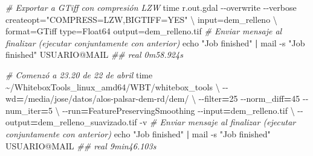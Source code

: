 \documentclass[spanish]{article}
\newenvironment{Shaded}{\begin{snugshade}}{\end{snugshade}}
\newcommand{\AttributeTok}[1]{\textcolor[rgb]{0.77,0.63,0.00}{#1}}
\newcommand{\BuiltInTok}[1]{#1}
\newcommand{\CommentTok}[1]{\textcolor[rgb]{0.56,0.35,0.01}{\textit{#1}}}
\newcommand{\DataTypeTok}[1]{\textcolor[rgb]{0.13,0.29,0.53}{#1}}
\newcommand{\ExtensionTok}[1]{#1}
\newcommand{\KeywordTok}[1]{\textcolor[rgb]{0.13,0.29,0.53}{\textbf{#1}}}
\newcommand{\NormalTok}[1]{#1}
\newcommand{\OperatorTok}[1]{\textcolor[rgb]{0.81,0.36,0.00}{\textbf{#1}}}
\newcommand{\StringTok}[1]{\textcolor[rgb]{0.31,0.60,0.02}{#1}}
\begin{document}
\begin{Shaded}
\begin{Highlighting}[]
\CommentTok{\# Exportar a GTiff con compresión LZW}
\BuiltInTok{time}\NormalTok{ r.out.gdal }\AttributeTok{{-}{-}overwrite} \AttributeTok{{-}{-}verbose}\NormalTok{ createopt=}\StringTok{"COMPRESS=LZW,BIGTIFF=YES"} \DataTypeTok{\textbackslash{}}
\NormalTok{  input=dem\_relleno }\DataTypeTok{\textbackslash{}}
\NormalTok{  format=GTiff type=Float64 output=dem\_relleno.tif}
\CommentTok{\# Enviar mensaje al finalizar (ejecutar conjuntamente con anterior)}
\BuiltInTok{echo} \StringTok{"Job finished"} \KeywordTok{|} \ExtensionTok{mail} \AttributeTok{{-}s} \StringTok{"Job finished"}\NormalTok{ USUARIO@MAIL}
\CommentTok{\#\# real 0m58.924s}

\CommentTok{\# Comenzó a 23.20 de 22 de abril}
\BuiltInTok{time}\NormalTok{ \textasciitilde{}/WhiteboxTools\_linux\_amd64/WBT/whitebox\_tools }\DataTypeTok{\textbackslash{}}
  \AttributeTok{{-}{-}wd}\OperatorTok{=}\StringTok{\textquotesingle{}/media/jose/datos/alos{-}palsar{-}dem{-}rd/dem/\textquotesingle{}} \DataTypeTok{\textbackslash{}}
  \AttributeTok{{-}{-}filter}\OperatorTok{=}\NormalTok{25 }\AttributeTok{{-}{-}norm\_diff}\OperatorTok{=}\NormalTok{45 }\AttributeTok{{-}{-}num\_iter}\OperatorTok{=}\NormalTok{5 }\DataTypeTok{\textbackslash{}}
  \AttributeTok{{-}{-}run}\OperatorTok{=}\NormalTok{FeaturePreservingSmoothing }\AttributeTok{{-}{-}input}\OperatorTok{=}\StringTok{\textquotesingle{}dem\_relleno.tif\textquotesingle{}} \DataTypeTok{\textbackslash{}}
  \AttributeTok{{-}{-}output}\OperatorTok{=}\StringTok{\textquotesingle{}dem\_relleno\_suavizado.tif\textquotesingle{}} \AttributeTok{{-}v}
\CommentTok{\# Enviar mensaje al finalizar (ejecutar conjuntamente con anterior)}
\BuiltInTok{echo} \StringTok{"Job finished"} \KeywordTok{|} \ExtensionTok{mail} \AttributeTok{{-}s} \StringTok{"Job finished"}\NormalTok{ USUARIO@MAIL}
\CommentTok{\#\# real 9min46.103s}
\end{Highlighting}
\end{Shaded}
\end{document}
